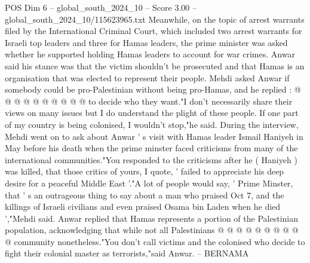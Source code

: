\begin{textsample}{POS Dim 6 – global\_south\_2024\_10 – Score 3.00 – global\_south\_2024\_10/115623965.txt}
Meanwhile, on the topic of arrest warrants filed by the International Criminal Court, which included two arrest warrants for Israeli top leaders and three for Hamas leaders, the prime minister was asked whether he supported holding Hamas leaders to account for war crimes.
Anwar said his stance was that the victim shouldn't be prosecuted and that Hamas is an organisation that was elected to represent their people.
Mehdi asked Anwar if somebody could be pro-Palestinian without being pro-Hamas, and he replied : @ @ @ @ @ @ @ @ @ @ to decide who they want."I don't necessarily share their views on many issues but I do understand the plight of these people.
If one part of my country is being colonised, I wouldn't stop,"he said.
During the interview, Mehdi went on to ask about Anwar ' s visit with Hamas leader Ismail Haniyeh in May before his death when the prime minster faced criticisms from many of the international communities."You responded to the criticisms after he ( Haniyeh ) was killed, that those critics of yours, I quote, ' failed to appreciate his deep desire for a peaceful Middle East '."A lot of people would say, ' Prime Minster, that ' s an outrageous thing to say about a man who praised Oct 7, and the killings of Israeli civilians and even praised Osama bin Laden when he died ',"Mehdi said.
Anwar replied that Hamas represents a portion of the Palestinian population, acknowledging that while not all Palestinians @ @ @ @ @ @ @ @ @ @ community nonetheless."You don't call victims and the colonised who decide to fight their colonial master as terrorists,"said Anwar. -- BERNAMA

\end{textsample}
